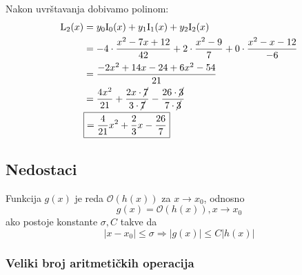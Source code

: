 \begin{multicols}{2}

\vspace*{0pt}

Nakon uvrštavanja dobivamo polinom:
\begin{align*}
\mathrm{L}_2(x) &= y_0\mathrm{I}_0(x) + y_1\mathrm{I}_1(x) + y_2\mathrm{I}_2(x)\\
&= -4\cdot\frac{x^2-7x+12}{42} + 2\cdot\frac{x^2-9}{7} + 0\cdot\frac{x^2-x-12}{-6}\\
&= \frac{-2x^2+14x-24+6x^2-54}{21}\\
&= \frac{4x^2}{21} + \frac{2x\cdot\cancel{7}}{3\cdot\cancel{7}} - \frac{26\cdot\cancel{3}}{7\cdot\cancel{3}}\\
&\boxed{= {\frac{4}{21}}x^2 + {\frac{2}{3}}x - {\frac{26}{7}}}
\end{align*}

\vspace*{0pt}

\newcolumn

\vspace*{0pt}


\end{multicols}

\subsection{Nedostaci}

\begin{definitionbox}
    Funkcija $g(x)$ je reda $\mathcal{O}(h(x))$ za $x \to x_0$, odnosno
    $$
    g(x) = \mathcal{O}(h(x)), x\to x_0
    $$
    ako postoje konstante $\sigma, C$ takve da
    $$
    |x-x_0| \leq \sigma \Rightarrow |g(x)| \leq C|h(x)|
    $$
\end{definitionbox}

\subsubsection{Veliki broj aritmetičkih operacija}

